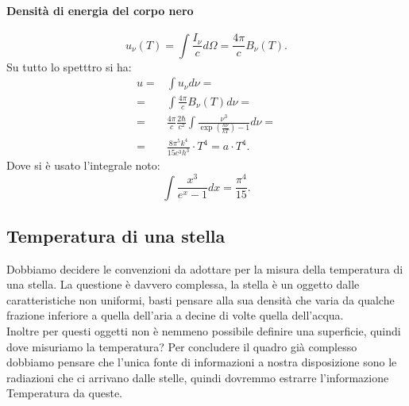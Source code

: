 \paragraph{Densità di energia del corpo nero}
\[
	u_{\nu} ( T) = \int \frac{I_{\nu} }{c}d\Omega = \frac{4\pi}{c}B_{\nu} ( T) 
.\] 
Su tutto lo spetttro si ha:
\begin{align}
	u =& \int u_{\nu} d\nu =\\
	=& \int \frac{4\pi}{c} B_{\nu} ( T) d\nu =\\
	=& \frac{4\pi}{c}\frac{2\hbar }{c^2} \int \frac{\nu ^3}{\exp\left( \frac{h \nu }{kT} \right) -1}d\nu = \\
	=& \frac{8\pi^{5}k^{4}}{15c^3h^3}\cdot T^{4} = a \cdot T^{4}
.\end{align}
Dove si è usato l'integrale noto:
\[
	\int \frac{x^3}{e^{x}-1}dx = \frac{\pi^{4}}{15}
.\] 
\subsection{Temperatura di una stella}%
Dobbiamo decidere le convenzioni da adottare per la misura della temperatura di una stella. La questione è davvero complessa, la stella è un oggetto dalle caratteristiche non uniformi, basti pensare alla sua densità che varia da qualche frazione inferiore a quella dell'aria a decine di volte quella dell'acqua. \\
Inoltre per questi oggetti non è nemmeno possibile definire una superficie, quindi dove misuriamo la temperatura? Per concludere il quadro già complesso dobbiamo pensare che l'unica fonte di informazioni a nostra disposizione sono le radiazioni che ci arrivano dalle stelle, quindi dovremmo estrarre l'informazione Temperatura da queste.
